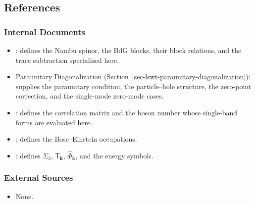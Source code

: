 \subsection{References}

\subsubsection{Internal Documents}

\begin{itemize}
\tightlist
\item
  : defines the Nambu spinor, the BdG blocks, their block relations, and the trace subtraction specialized here.
\item
  Paraunitary Diagonalization (Section~\ref{sec-lswt-paraunitary-diagonalization}): supplies the paraunitary condition, the particle--hole structure, the zero-point correction, and the single-mode zero-mode cases.
\item
  : defines the correlation matrix and the boson number whose single-band forms are evaluated here.
\item
  : defines the Bose--Einstein occupations.
\item
  : defines \(\Sigma_3\), \(\mathsf T_{\mathbf k}\), \(\hat\Phi_{\mathbf k}\), and the energy symbols.
\end{itemize}

\subsubsection{External Sources}

\begin{itemize}
\tightlist
\item
  None.
\end{itemize}
